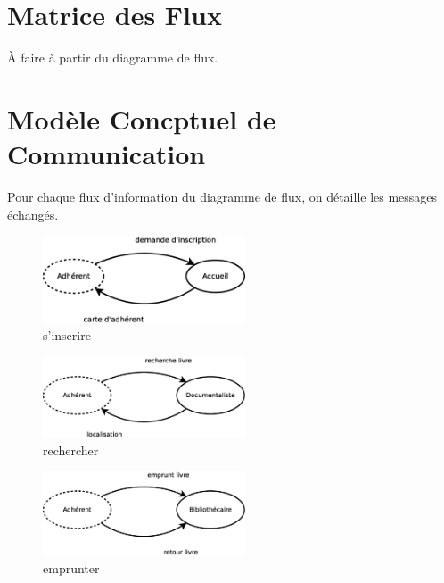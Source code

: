 \section*{Matrice des Flux}

À faire à partir du diagramme de flux.

\newpage
\section*{Modèle Concptuel de Communication}

Pour chaque flux d'information du diagramme de flux, on détaille les messages échangés.

\begin{figure}[!htb]
    \begin{center}
    \includegraphics[width=6cm]{images/cc1_mcc1.eps}
    \caption{\label{cc1_mcc1} s'inscrire}
    \end{center}
\end{figure}

\begin{figure}[!htb]
    \begin{center}
    \includegraphics[width=6cm]{images/cc1_mcc2.eps}
    \caption{\label{cc1_mcc2} rechercher}
    \end{center}
\end{figure}

\begin{figure}[!htb]
    \begin{center}
    \includegraphics[width=6cm]{images/cc1_mcc3.eps}
    \caption{\label{cc1_mcc3} emprunter}
    \end{center}
\end{figure}

